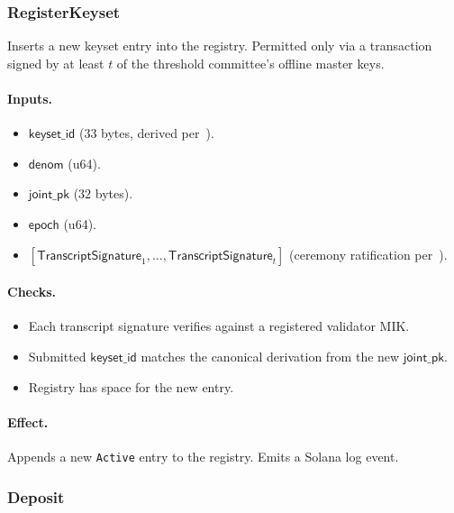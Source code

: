 \subsubsection{RegisterKeyset}
\label{sec:onchain-instr-register}

Inserts a new keyset entry into the registry. Permitted only via a transaction signed by at least $t$ of the threshold committee's offline master keys.

\paragraph{Inputs.}
\begin{itemize}[leftmargin=2em,itemsep=0pt]
  \item $\mathsf{keyset\_id}$ ($33$ bytes, derived per~).
  \item $\mathsf{denom}$ (u64).
  \item $\mathsf{joint\_pk}$ ($32$ bytes).
  \item $\mathsf{epoch}$ (u64).
  \item $[\mathsf{TranscriptSignature}_1, \ldots, \mathsf{TranscriptSignature}_t]$ (ceremony ratification per~).
\end{itemize}

\paragraph{Checks.}
\begin{itemize}[leftmargin=2em,itemsep=0pt]
  \item Each transcript signature verifies against a registered validator MIK.
  \item Submitted $\mathsf{keyset\_id}$ matches the canonical derivation from the new $\mathsf{joint\_pk}$.
  \item Registry has space for the new entry.
\end{itemize}

\paragraph{Effect.} Appends a new \texttt{Active} entry to the registry. Emits a Solana log event.

\subsubsection{Deposit}
\label{sec:onchain-instr-deposit}

